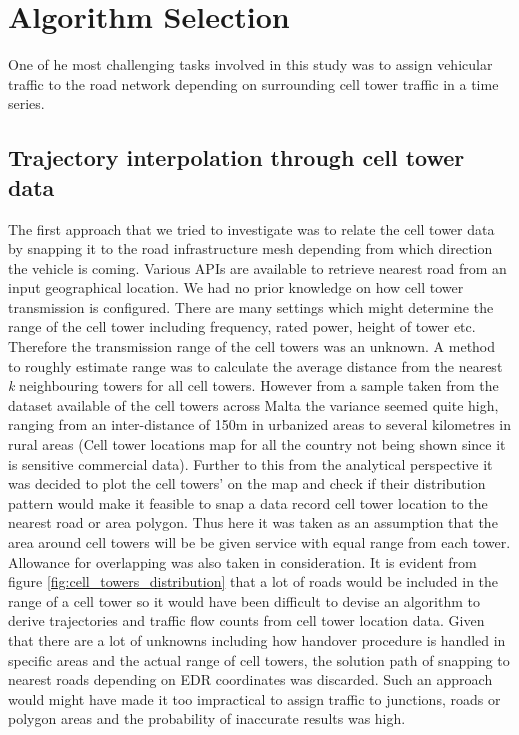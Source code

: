 \documentclass[12pt, a4paper]{report}
\theoremstyle{definition}
\theoremstyle{definition}%
\theoremstyle{definition}%
\theoremstyle{definition}%
\theoremstyle{definition}%
\theoremstyle{definition}%
\begin{document}
\section{Algorithm Selection} \label{section:methodology:algorithm_selection}

One of he most challenging tasks involved in this study was to assign vehicular traffic to the road network depending on surrounding cell tower traffic in a time series.

\subsection{Trajectory interpolation through cell tower data} \label{subsection:methodology:trajectory_interpolation}
The first approach that we tried to investigate was to relate the cell tower data by snapping it to the road infrastructure mesh depending from which direction the vehicle is coming. Various APIs are available to retrieve nearest road from an input geographical location. We had no prior knowledge on how cell tower transmission is configured. There are many settings which might determine the range of the cell tower including frequency, rated power, height of tower etc. Therefore the transmission range of the cell towers was an unknown. A method to roughly estimate range was to calculate the average distance from the nearest \textit{k} neighbouring towers for all cell towers. However from a sample taken from the dataset available of the cell towers across Malta the variance seemed quite high, ranging from an inter-distance of 150m in urbanized areas to several kilometres in rural areas (Cell tower locations map for all the country not being shown since it is sensitive commercial data). Further to this from the analytical perspective it was decided to plot the cell towers' on the map and check if their distribution pattern would make it feasible to snap a data record cell tower location to the nearest road or area polygon. Thus here it was taken as an assumption that the area around cell towers will be be given service with equal range from each tower. Allowance for overlapping was also taken in consideration. It is evident from figure \ref{fig:cell_towers_distribution} that a lot of roads would be included in the range of a cell tower so it would have been difficult to devise an algorithm to derive trajectories and traffic flow counts from cell tower location data. Given that there are a lot of unknowns including how handover procedure is handled in specific areas and the actual range of cell towers, the solution path of snapping to nearest roads depending on EDR coordinates was discarded. Such an approach would might have made it too impractical to assign traffic to junctions, roads or polygon areas and the probability of inaccurate results was high.
\end{document}
